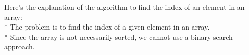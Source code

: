 \documentclass[preview]{standalone}
\begin{document}
Here's the explanation of the algorithm to find the index of an element in an array:\\* The problem is to find the index of a given element in an array.\\* Since the array is not necessarily sorted, we cannot use a binary search approach.\\
\end{document}
